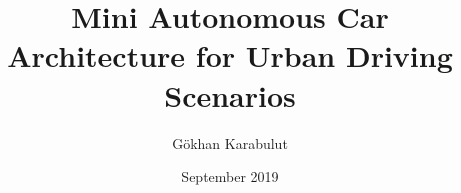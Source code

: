 \documentclass[chaparabic,ceng,ms,12pt,oneandhalf]{metu}
\author{Gökhan Karabulut}
\title{Mini Autonomous Car Architecture for Urban Driving Scenarios}
\date{September 2019}
\numberwithin{equation}{chapter}
\begin{document}
\begin{preliminaries}


\end{preliminaries}
%
%
%

\setlength{\parindent}{0em}
\setlength{\parskip}{10pt}












%

% 

% 
\end{document}
